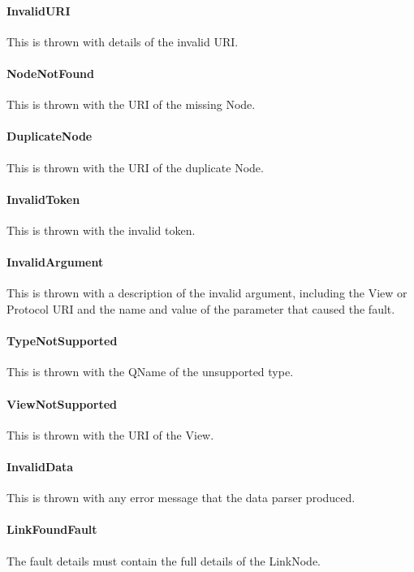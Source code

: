 \documentclass[11pt,a4paper]{ivoa}
\begin{document}
\paragraph{InvalidURI}
This is thrown with details of the invalid URI.

\paragraph{NodeNotFound}
This is thrown with the URI of the missing Node.

\paragraph{DuplicateNode}
This is thrown with the URI of the duplicate Node.

\paragraph{InvalidToken}
This is thrown with the invalid token.

\paragraph{InvalidArgument}
This is thrown with a description of the invalid argument, including the View or Protocol URI and the name and value of the parameter that caused the fault.

\paragraph{TypeNotSupported}
This is thrown with the QName of the unsupported type.

\paragraph{ViewNotSupported}
This is thrown with the URI of the View.

\paragraph{InvalidData}
This is thrown with any error message that the data parser produced.

\paragraph{LinkFoundFault}
The fault details must contain the full details of the LinkNode.
\end{document}
